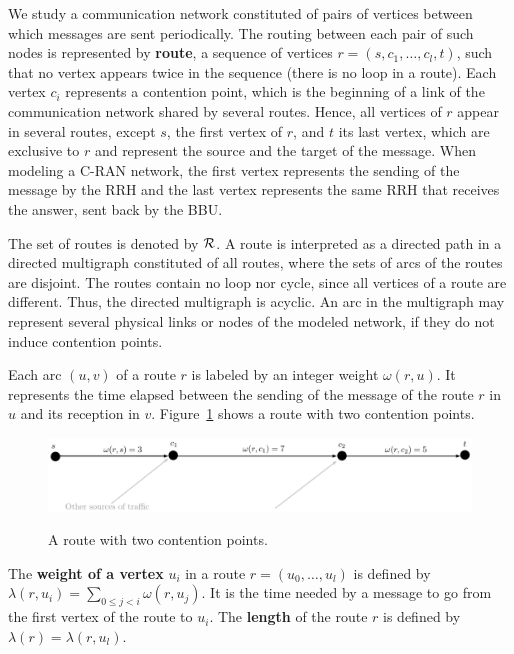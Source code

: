 \documentclass[a4paper,10pt]{journal}
\begin{document}
  	We study a communication network constituted of pairs of vertices between which messages are sent periodically. The routing between each pair of such nodes is represented by \textbf{route}, a sequence of vertices $r=(s, c_1, \ldots, c_l, t)$, such that no vertex appears twice in the sequence (there is no loop in a route). Each vertex $c_i$ represents a contention point, which is the beginning of a link of the communication network shared by several routes. Hence, all vertices of $r$ appear in several routes, except $s$, the first vertex of $r$, and $t$ its last vertex, which are exclusive to $r$ and represent the source and the target of the message. When modeling a C-RAN network, the first vertex represents the sending of the message by the RRH and the last vertex represents the same RRH that receives the answer, sent back by the BBU.

  	The set of routes is denoted by ${\cal R}$. A route is interpreted as a directed path in a directed multigraph constituted of all routes, where the sets of arcs of the routes are disjoint. The routes contain no loop nor cycle, since all vertices of a route are different. Thus, the directed multigraph is acyclic. An arc in the multigraph may represent several physical links or nodes of the modeled network, if they do not induce contention points. 


  	Each arc $(u,v)$ of a route $r$ is labeled by an integer weight $\omega(r,u)$. It represents the time elapsed between the sending of the message of the route $r$ in $u$ and its reception in $v$. Figure~\ref{fig:routeexample} shows a route with two contention points.



\begin{figure}
\centering

	
	\includegraphics[scale=0.7]{routeexample}\\

\caption{A route with two contention points.}
\label{fig:routeexample}
\end{figure} 
 

    The {\bf weight of a vertex} $u_i$ in a route $r=(u_0,\dots,u_l)$ is defined by $\lambda(r,u_i)= \sum\limits_{0 \leq j <i} \omega(r,u_j)$. It is the time needed by a message to go from the first vertex of the route to $u_i$. The \textbf{length} of the route $r$ is defined by $\lambda(r)= \lambda(r,u_l)$. 
\end{document}
